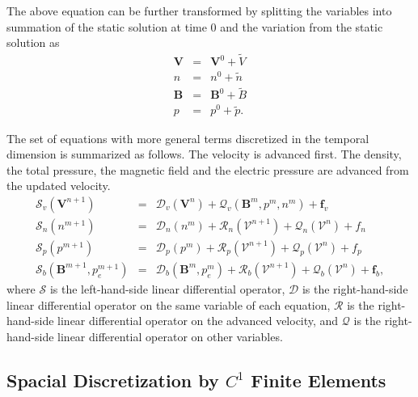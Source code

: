 \documentclass[11pt]{article}  %
\begin{document}
The above equation can be further transformed by splitting the variables into summation of the static solution at time 0 and the variation from the static solution \cite{ferraro2009calculations} as
\begin{subequations} 
\begin{eqnarray}
\mathbf{V} &=& \mathbf{V}^0+ \tilde{V} \\
n &=& n^0+ \tilde{n} \\
\mathbf{B} &=& \mathbf{B}^0+ \tilde{B} \\
p &=& p^0+ \tilde{p}.
\end{eqnarray}
\end{subequations}

The set of equations with more general terms discretized in the temporal dimension is summarized as follows. The velocity is advanced first. The density,  the total pressure, the magnetic field and the electric pressure are advanced from the updated velocity.
\begin{subequations}  \label{eqn:mhdTimeStepMatrixForm}
\begin{eqnarray}
\mathcal{S}_v (\mathbf{V}^{n+1})&=& \mathcal{D}_v (\mathbf{V}^{n}) + \mathcal{Q}_v (\mathbf{B}^{m}, p^m, n^m) + \mathbf{f}_v \\
\mathcal{S}_n (n^{m+1})&=& \mathcal{D}_n (n^{m}) + \mathcal{R}_n(\mathcal{V}^{n+1}) + \mathcal{Q}_n(\mathcal{V}^{n}) + f_n \\
\mathcal{S}_p (p^{m+1})&=& \mathcal{D}_p (p^{m}) + \mathcal{R}_p(\mathcal{V}^{n+1}) + \mathcal{Q}_p(\mathcal{V}^{n}) + f_p \\
\mathcal{S}_b (\mathbf{B}^{m+1}, p_e^{m+1})&=& \mathcal{D}_b (\mathbf{B}^{m}, p_e^m) + \mathcal{R}_b(\mathcal{V}^{n+1}) + \mathcal{Q}_b (\mathcal{V}^{n}) + \mathbf{f}_b,
\end{eqnarray}
\end{subequations}
where $\mathcal{S}$ is the left-hand-side linear differential operator, $\mathcal{D}$ is the right-hand-side linear differential operator on the same variable of each equation, $\mathcal{R}$ is the right-hand-side linear differential operator on the advanced velocity, and $\mathcal{Q}$ is the right-hand-side linear differential operator on other variables.

\subsection{Spacial Discretization by $C^1$ Finite Elements} \label{sec:element}
\end{document}
